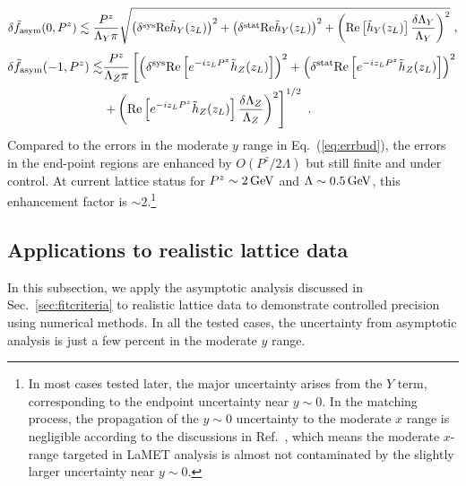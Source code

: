 \documentclass[a4paper,11pt]{article}
\begin{document}
\begin{align}
\delta\tilde f_{\rm asym}(0,P^z)  \lesssim  \frac{P^z}{\Lambda_Y \pi} \sqrt{ \left(\delta^{\rm sys}{\rm Re}\tilde{h}_{Y}(z_L)\right)^2 + \left(\delta^{\rm stat}{\rm Re}\tilde{h}_{Y}(z_L)\right)^2 + \left({\rm Re}\left[\tilde{h}_{Y}(z_L)\right]\frac{\delta \Lambda_{Y}}{\Lambda_{Y}}\right)^2 } \ ,
\end{align}
\begin{align}
\delta\tilde f_{\rm asym}(-1,P^z)  \lesssim  &\frac{P^z}{\Lambda_Z \pi}  \left[ \left(\delta^{\rm sys}{\rm Re}\left[ e^{-i z_L P^z}\tilde{h}_{Z}(z_L)\right]\right)^2 + \left(\delta^{\rm stat}{\rm Re}\left[ e^{-i z_L P^z}\tilde{h}_{Z}(z_L)\right]\right)^2 \right.\nonumber\\ 
&\left. + \left({\rm Re}\left[ e^{-i z_L P^z}\tilde{h}_{Z}(z_L)\right]\frac{\delta \Lambda_{Z}}{\Lambda_{Z}}\right)^2 \right]^{1/2}  \ .
\end{align}
Compared to the errors in the moderate $y$ range in Eq.~(\ref{eq:errbud}), the errors in the end-point regions are enhanced by $O(P^z/2\Lambda)$ but still finite and under control. At current lattice status for $P^z \sim 2 \, {\rm GeV}$ and $\Lambda \sim 0.5 \, {\rm GeV}$, this enhancement factor is $\sim 2$.\footnote{In most cases tested later, the major uncertainty arises from the $Y$ term, corresponding to the endpoint uncertainty near $y\sim 0$. In the matching process, the propagation of the $y\sim 0$ uncertainty to the moderate $x$ range is negligible according to the discussions in Ref.~\cite{Chen:2025cxr}, which means the moderate $x$-range targeted in LaMET analysis is almost not contaminated by the slightly larger uncertainty near $y\sim 0$.} 


\subsection{Applications to realistic lattice data}\label{sec:applications}
In this subsection, we apply the asymptotic analysis discussed in Sec.~\ref{sec:fitcriteria} to realistic lattice data to demonstrate controlled precision using numerical methods. In all the tested cases, the uncertainty from asymptotic analysis is just a few percent in the moderate $y$ range. 
\end{document}
